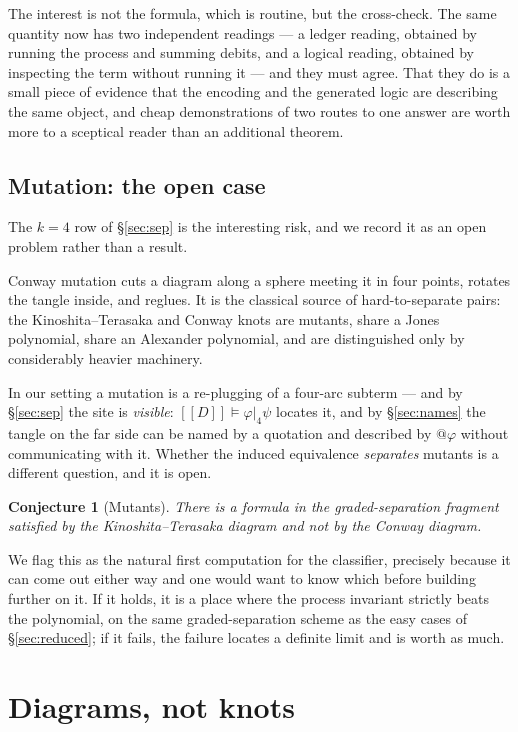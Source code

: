 \documentclass[11pt]{article}
\newtheorem{conjecture}{Conjecture}
\theoremstyle{definition}
\newcommand{\enc}[1]{[\![ #1 ]\!]}
\newcommand{\ssep}[1]{\mathbin{\vert_{#1}}}
\begin{document}
The interest is not the formula, which is routine, but the cross-check. The same
quantity now has two independent readings --- a ledger reading, obtained by
running the process and summing debits, and a logical reading, obtained by
inspecting the term without running it --- and they must agree. That they do is a
small piece of evidence that the encoding and the generated logic are describing
the same object, and cheap demonstrations of two routes to one answer are worth
more to a sceptical reader than an additional theorem.

\subsection{Mutation: the open case}\label{sec:mutation}

The $k=4$ row of \S\ref{sec:sep} is the interesting risk, and we record it as an
open problem rather than a result.

Conway mutation cuts a diagram along a sphere meeting it in four points, rotates
the tangle inside, and reglues. It is the classical source of hard-to-separate
pairs: the Kinoshita--Terasaka and Conway knots are mutants, share a Jones
polynomial, share an Alexander polynomial, and are distinguished only by
considerably heavier machinery.

In our setting a mutation is a re-plugging of a four-arc subterm --- and by
\S\ref{sec:sep} the site is \emph{visible}: $\enc{D} \models \varphi \ssep{4}
\psi$ locates it, and by \S\ref{sec:names} the tangle on the far side can be named
by a quotation and described by $@\varphi$ without communicating with it. Whether
the induced equivalence \emph{separates} mutants is a different question, and it
is open.

\begin{conjecture}[Mutants]\label{conj:mutants}
There is a formula in the graded-separation fragment satisfied by the
Kinoshita--Terasaka diagram and not by the Conway diagram.
\end{conjecture}

We flag this as the natural first computation for the classifier, precisely
because it can come out either way and one would want to know which before
building further on it. If it holds, it is a place where the process invariant
strictly beats the polynomial, on the same graded-separation scheme as the easy
cases of \S\ref{sec:reduced}; if it fails, the failure locates a definite limit
and is worth as much.

\section{Diagrams, not knots}\label{sec:diagrams}
\end{document}
